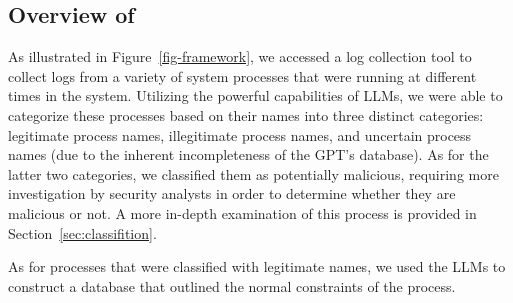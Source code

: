 
\subsection{Overview of \tool}
As illustrated in Figure~\ref{fig-framework}, we accessed a log collection tool to collect logs from a variety of system processes that were running at different times in the system. Utilizing the powerful capabilities of LLMs, we were able to categorize these processes based on their names into three distinct categories: legitimate process names, illegitimate process names, and uncertain process names (due to the inherent incompleteness of the GPT's database). As for the latter two categories, we classified them as potentially malicious, requiring more investigation by security analysts in order to determine whether they are malicious or not. A more in-depth examination of this process is provided in Section~\ref{sec:classifition}.

As for processes that were classified with legitimate names, we used the LLMs to construct a database that outlined the normal constraints of the process.

